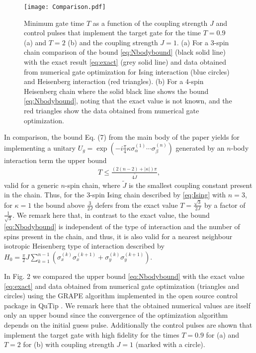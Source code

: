 \documentclass[aps,twocolumn,amsmath,amssymb,nofootinbib,superscriptaddress]{revtex4-1}
\begin{document}
  \begin{figure}[!h]
  \texttt{[image: Comparison.pdf]}
 \caption{Minimum gate time $T$ as a function of the coupling strength $J$ and control pulses that implement the target gate for the time $T=0.9$ (a) and $T=2$ (b) and the coupling strength $J=1$. (a) For a 3-spin chain comparison of the bound \eqref{eq:Nbodybound} (black solid line) with the exact result \eqref{eq:exact} (grey solid line) and data obtained from numerical gate optimization for Ising interaction (blue circles) and Heisenberg interaction (red triangles). (b) For a 4-spin Heisenberg chain where the solid black line shows the bound \eqref{eq:Nbodybound}, noting that the exact value is not known, and the red triangles show the data obtained from numerical gate optimization.}
\end{figure}

In comparison, the bound Eq. (7) from the main body of the paper yields for implementing a unitary $U_{g}=\exp(-i\frac{\pi}{4}\kappa \sigma_{\alpha}^{(1)}\cdots \sigma_{\beta}^{(n)})$ generated by an $n$-body interaction term the upper bound
\begin{align}
\label{eq:Nbodybound}
T\leq\frac{(2(n-2)+|\kappa|)\pi}{4\tilde{J}},
\end{align}
valid for a generic $n$-spin chain, where $\tilde{J}$ is the smallest coupling constant present in the chain. Thus, for the 3-spin Ising chain described by \eqref{eq:Ising} with $n=3$, for $\kappa=1$ the bound above $\frac{3}{2J}$ defers from the exact value $T=\frac{\sqrt{3}}{2J}$ by a factor of $\frac{1}{\sqrt{3}}$.  We remark here that, in contrast to the exact value, the bound \eqref{eq:Nbodybound} is independent of the type of interaction and the number of spins present in the chain, and thus, it is also valid for a nearest neighbour isotropic Heisenberg type of interaction described by $H_{0}=\frac{\pi}{2} J\sum_{k=1}^{n-1}(\sigma_{x}^{(k)}\sigma_{x}^{(k+1)}+\sigma_{y}^{(k)}\sigma_{y}^{(k+1)})$.  



In Fig. 2 we compared the upper bound \eqref{eq:Nbodybound} with the exact value \eqref{eq:exact} and data obtained from numerical gate optimization (triangles and circles) using the GRAPE algorithm \cite{Grape} implemented in the open source control package in QuTip \cite{QuTip1, QuTip2}. We remark here that the obtained numerical values are itself only an upper bound since the convergence of the optimization algorithm depends on the initial guess pulse.  Additionally the control pulses are shown that implement the target gate with high fidelity for the times $T=0.9$ for (a) and $T=2$ for (b) with coupling strength $J=1$ (marked with a circle).
\end{document}
